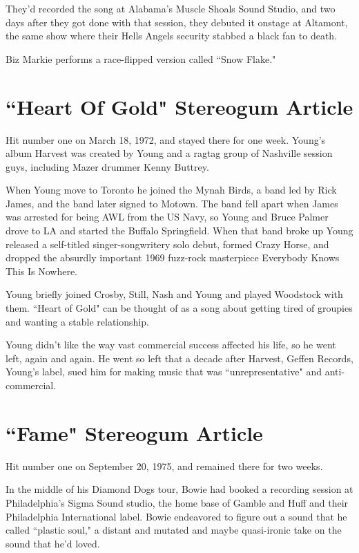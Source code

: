 \documentclass[12pt, a4paper, twoside, openright, titlepage]{book}
\begin{document}
They'd recorded the song at Alabama's Muscle Shoals Sound Studio, and two days after they got done with that session, they debuted it onstage at Altamont, the same show where their Hells Angels security stabbed a black fan to death.

Biz Markie performs a race-flipped version called ``Snow Flake."


\section{``Heart Of Gold" Stereogum Article}

Hit number one on March 18, 1972, and stayed there for one week. Young's album Harvest was created by Young and a ragtag group of Nashville session guys, including Mazer drummer Kenny Buttrey. 

When Young move to Toronto he joined the Mynah Birds, a band led by Rick James, and the band later signed to Motown. The band fell apart when James was arrested for being AWL from the US Navy, so Young and Bruce Palmer drove to LA and started the Buffalo Springfield. When that band broke up Young released a self-titled singer-songwritery solo debut, formed Crazy Horse, and dropped the absurdly important 1969 fuzz-rock masterpiece Everybody Knows This Is Nowhere. 

Young briefly joined Crosby, Still, Nash and Young and played Woodstock with them. ``Heart of Gold" can be thought of as a song about getting tired of groupies and wanting a stable relationship.

Young didn't like the way vast commercial success affected his life, so he went left, again and again. He went so left that a decade after Harvest, Geffen Records, Young's label, sued him for making music that was ``unrepresentative" and anti-commercial.


\section{``Fame" Stereogum Article}

Hit number one on September 20, 1975, and remained there for two weeks. 

In the middle of his Diamond Dogs tour, Bowie had booked a recording session at Philadelphia's Sigma Sound studio, the home base of Gamble and Huff and their Philadelphia International label. Bowie endeavored to figure out a sound that he called ``plastic soul," a distant and mutated and maybe quasi-ironic take on the sound that he'd loved.
\end{document}
